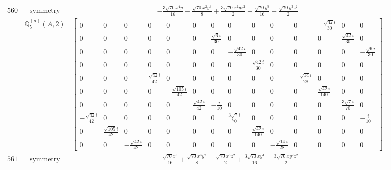 \documentclass[fleqn,8pt,landscape]{jsarticle}
\begin{document}
\begin{longtable}{ccc}
$ 560 $ & $ \text{symmetry} $ & $ - \frac{3 \sqrt{70} x^{4} y}{16} - \frac{\sqrt{70} x^{2} y^{3}}{8} + \frac{3 \sqrt{70} x^{2} y z^{2}}{2} + \frac{\sqrt{70} y^{5}}{16} - \frac{\sqrt{70} y^{3} z^{2}}{2} $ \\
$  $ & $ \mathbb{Q}_{5}^{(a)}(A,2) $ & $ \begin{bmatrix} 0 & 0 & 0 & 0 & 0 & 0 & 0 & 0 & 0 & 0 & 0 & - \frac{\sqrt{42} i}{30} & 0 & 0 \\ 0 & 0 & 0 & 0 & 0 & 0 & \frac{\sqrt{6} i}{30} & 0 & 0 & 0 & 0 & 0 & \frac{\sqrt{42} i}{30} & 0 \\ 0 & 0 & 0 & 0 & 0 & 0 & 0 & - \frac{\sqrt{42} i}{30} & 0 & 0 & 0 & 0 & 0 & - \frac{\sqrt{6} i}{30} \\ 0 & 0 & 0 & 0 & 0 & 0 & 0 & 0 & \frac{\sqrt{42} i}{30} & 0 & 0 & 0 & 0 & 0 \\ 0 & 0 & 0 & \frac{\sqrt{42} i}{42} & 0 & 0 & 0 & 0 & 0 & 0 & - \frac{\sqrt{14} i}{28} & 0 & 0 & 0 \\ 0 & 0 & 0 & 0 & - \frac{\sqrt{105} i}{42} & 0 & 0 & 0 & 0 & 0 & 0 & \frac{\sqrt{42} i}{140} & 0 & 0 \\ 0 & 0 & 0 & 0 & 0 & \frac{\sqrt{42} i}{42} & - \frac{i}{10} & 0 & 0 & 0 & 0 & 0 & \frac{3 \sqrt{7} i}{70} & 0 \\ - \frac{\sqrt{42} i}{42} & 0 & 0 & 0 & 0 & 0 & 0 & \frac{3 \sqrt{7} i}{70} & 0 & 0 & 0 & 0 & 0 & - \frac{i}{10} \\ 0 & \frac{\sqrt{105} i}{42} & 0 & 0 & 0 & 0 & 0 & 0 & \frac{\sqrt{42} i}{140} & 0 & 0 & 0 & 0 & 0 \\ 0 & 0 & - \frac{\sqrt{42} i}{42} & 0 & 0 & 0 & 0 & 0 & 0 & - \frac{\sqrt{14} i}{28} & 0 & 0 & 0 & 0 \end{bmatrix} $ \\ \hline
$ 561 $ & $ \text{symmetry} $ & $ - \frac{\sqrt{70} x^{5}}{16} + \frac{\sqrt{70} x^{3} y^{2}}{8} + \frac{\sqrt{70} x^{3} z^{2}}{2} + \frac{3 \sqrt{70} x y^{4}}{16} - \frac{3 \sqrt{70} x y^{2} z^{2}}{2} $ \\

\end{longtable}
\end{document}
